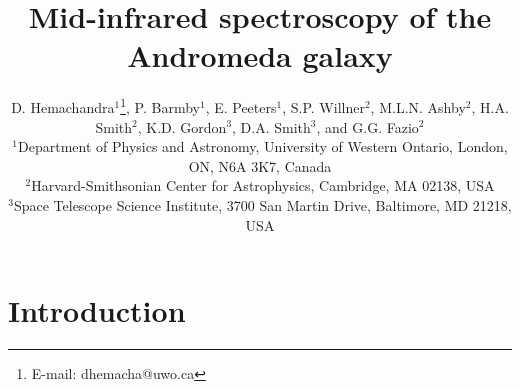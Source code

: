 \documentclass[useAMS,usenatbib,a4paper]{mn2e}
\title[Mid-infrared spectroscopy of M31]{Mid-infrared spectroscopy of the Andromeda galaxy}
\author[D. Hemachandra et al.]
{D. Hemachandra$^{1}$\thanks{E-mail: dhemacha@uwo.ca},
P. Barmby$^{1}$, 
E. Peeters$^{1}$, 
S.P. Willner$^{2}$, 
M.L.N. Ashby$^{2}$,
H.A. Smith$^{2}$, 
\newauthor 
K.D. Gordon$^{3}$,
D.A. Smith$^{3}$,
and
G.G. Fazio$^{2}$\\
$^{1}$Department of Physics and Astronomy, University of Western Ontario, London, ON, N6A 3K7, Canada\\
$^{2}$Harvard-Smithsonian Center for Astrophysics, Cambridge, MA 02138, USA\\
$^{3}$Space Telescope Science Institute, 3700 San Martin Drive, Baltimore, MD 21218, USA
}
\begin{document}
\date{}

\maketitle

\label{firstpage}



\section{Introduction}

%
%
%
%
%
%
%
%
\end{document}
